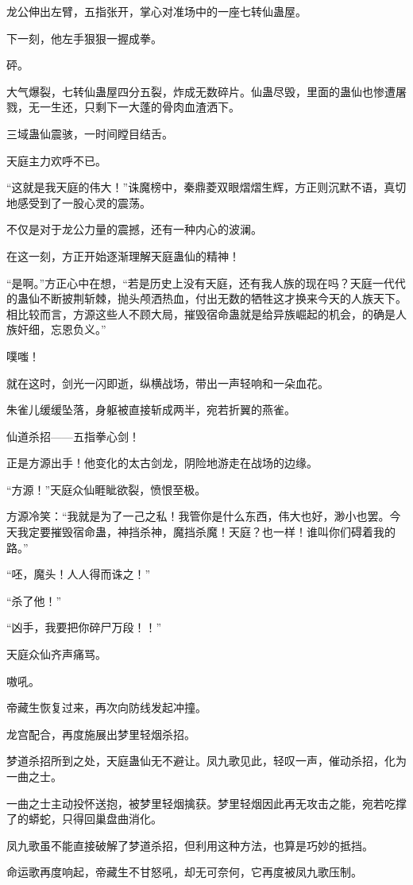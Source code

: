 \begin{this_body}
龙公伸出左臂，五指张开，掌心对准场中的一座七转仙蛊屋。

下一刻，他左手狠狠一握成拳。

砰。

大气爆裂，七转仙蛊屋四分五裂，炸成无数碎片。仙蛊尽毁，里面的蛊仙也惨遭屠戮，无一生还，只剩下一大蓬的骨肉血渣洒下。

三域蛊仙震骇，一时间瞠目结舌。

天庭主力欢呼不已。

“这就是我天庭的伟大！”诛魔榜中，秦鼎菱双眼熠熠生辉，方正则沉默不语，真切地感受到了一股心灵的震荡。

不仅是对于龙公力量的震撼，还有一种内心的波澜。

在这一刻，方正开始逐渐理解天庭蛊仙的精神！

“是啊。”方正心中在想，“若是历史上没有天庭，还有我人族的现在吗？天庭一代代的蛊仙不断披荆斩棘，抛头颅洒热血，付出无数的牺牲这才换来今天的人族天下。相比较而言，方源这些人不顾大局，摧毁宿命蛊就是给异族崛起的机会，的确是人族奸细，忘恩负义。”

噗嗤！

就在这时，剑光一闪即逝，纵横战场，带出一声轻响和一朵血花。

朱雀儿缓缓坠落，身躯被直接斩成两半，宛若折翼的燕雀。

仙道杀招——五指拳心剑！

正是方源出手！他变化的太古剑龙，阴险地游走在战场的边缘。

“方源！”天庭众仙睚眦欲裂，愤恨至极。

方源冷笑：“我就是为了一己之私！我管你是什么东西，伟大也好，渺小也罢。今天我定要摧毁宿命蛊，神挡杀神，魔挡杀魔！天庭？也一样！谁叫你们碍着我的路。”

“呸，魔头！人人得而诛之！”

“杀了他！”

“凶手，我要把你碎尸万段！！”

天庭众仙齐声痛骂。

嗷吼。

帝藏生恢复过来，再次向防线发起冲撞。

龙宫配合，再度施展出梦里轻烟杀招。

梦道杀招所到之处，天庭蛊仙无不避让。凤九歌见此，轻叹一声，催动杀招，化为一曲之士。

一曲之士主动投怀送抱，被梦里轻烟擒获。梦里轻烟因此再无攻击之能，宛若吃撑了的蟒蛇，只得回巢盘曲消化。

凤九歌虽不能直接破解了梦道杀招，但利用这种方法，也算是巧妙的抵挡。

命运歌再度响起，帝藏生不甘怒吼，却无可奈何，它再度被凤九歌压制。


\end{this_body}
